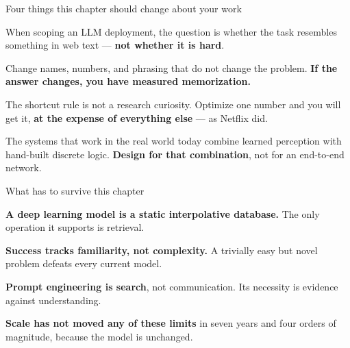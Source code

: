 \documentclass[aspectratio=169,11pt,t]{beamer}
\begin{document}
\begin{frame}[shrink=25]{Four things this chapter should change about your work}
\begin{minipage}[t]{0.494\textwidth}
\begin{icardaccent}
When scoping an LLM deployment, the question is whether the task resembles something in web text --- \textbf{not whether it is hard}.
\end{icardaccent}
\end{minipage}%
\hfill
\begin{minipage}[t]{0.494\textwidth}
\begin{icardaccent}
Change names, numbers, and phrasing that do not change the problem. \textbf{If the answer changes, you have measured memorization.}
\end{icardaccent}
\end{minipage}%


\vskip 4pt

\begin{minipage}[t]{0.494\textwidth}
\begin{icardaccent}
The shortcut rule is not a research curiosity. Optimize one number and you will get it, \textbf{at the expense of everything else} --- as Netflix did.
\end{icardaccent}
\end{minipage}%
\hfill
\begin{minipage}[t]{0.494\textwidth}
\begin{icardaccent}
The systems that work in the real world today combine learned perception with hand-built discrete logic. \textbf{Design for that combination}, not for an end-to-end network.
\end{icardaccent}
\end{minipage}%
\end{frame}

\begin{frame}[shrink=25]{What has to survive this chapter}
\begin{isteps}
\item \textbf{A deep learning model is a static interpolative database.} The only operation it supports is retrieval.
\item \textbf{Success tracks familiarity, not complexity.} A trivially easy but novel problem defeats every current model.
\item \textbf{Prompt engineering is search}, not communication. Its necessity is evidence against understanding.
\item \textbf{Scale has not moved any of these limits} in seven years and four orders of magnitude, because the model is unchanged.
\end{isteps}
\end{frame}
\end{document}
